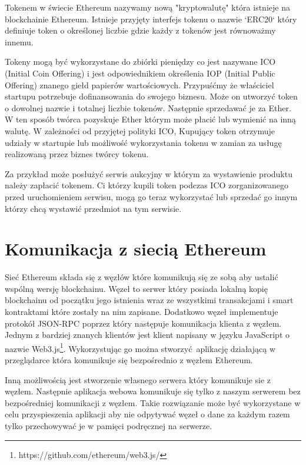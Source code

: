 \documentclass[]{llncs}
\begin{document}
  Tokenem w świecie Ethereum nazywamy nową "kryptowalutę" która istnieje na
  blockchainie Ethereum. Istnieje przyjęty interfejs tokenu o nazwie `ERC20`
  który definiuje token o określonej liczbie gdzie każdy z tokenów jest
  równoważmy innemu.

  Tokeny mogą być wykorzystane do zbiórki pieniędzy co jest nazywane ICO
  (Initial Coin Offering) i jest odpowiednikiem określenia IOP (Initial Public
  Offering) znanego giełd papierów wartościowych. Przypuśćmy że właściciel
  startupu potrzebuje dofinansowania do swojego biznesu. Może on utworzyć token
  o dowolnej nazwie i totalnej liczbie tokenów. Następnie sprzedawać je za
  Ether. W ten sposób twórca pozyskuje Ether którym może płacić lub wymienić na
  inną walutę. W zależności od przyjętej polityki ICO, Kupujący token otrzymuje
  udziały w startupie lub możliwość wykorzystania tokenu w zamian za usługę
  realizowaną przez biznes twórcy tokenu.

  Za przykład może posłużyć serwis aukcyjny w którym za wystawienie produktu
  należy zapłacić tokenem. Ci którzy kupili token podczas ICO zorganizowanego
  przed uruchomieniem serwisu, mogą go teraz wykorzystać lub sprzedać go innym
  którzy chcą wystawić przedmiot na tym serwisie.

\section{Komunikacja z siecią Ethereum}

  Sieć Ethereum składa się z węzłów które komunikują się ze sobą aby ustalić
  wspólną wersję blockchainu. Węzeł to serwer który posiada lokalną kopię
  blockchainu od początku jego istnienia wraz ze wszystkimi transakcjami i smart
  kontraktami które zostały na nim zapisane. Dodatkowo węzeł implementuje
  protokół JSON-RPC poprzez który następuje komunikacja klienta z węzłem.
  Jednym z bardziej znanych klientów jest klient napisany w języku JavaScript o
  nazwie Web3.js\footnote{https://github.com/ethereum/web3.js/}. Wykorzystując
  go można stworzyć aplikację działającą w przeglądarce która komunikuje się
  bezpośrednio z węzłem Ethereum.

  Inną możliwością jest stworzenie własnego serwera który komunikuje sie z
  węzłem. Następnie aplikacja webowa komunikuje się tylko z naszym serwerem bez
  bezpośredniej komunikacji z węzłem. Takie rozwiązanie może być wykorzystane w
  celu przyspieszenia aplikacji aby nie odpytywać węzeł o dane za każdym razem
  tylko przechowywać je w pamięci podręcznej na serwerze.
\end{document}
